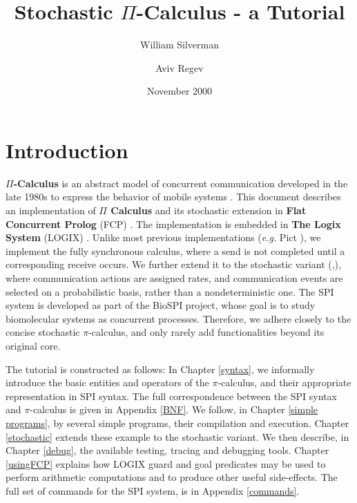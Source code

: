 \title{Stochastic $\Pi$-Calculus - a Tutorial}
\author{William Silverman \and Aviv Regev}
\date{November 2000}
 
\maketitle

\tableofcontents

\chapter{Introduction}
{\bf $\Pi$-Calculus} is an abstract model of concurrent communication
developed in the late 1980s to express the behavior of mobile systems
\cite{Milner99}.  This document describes an implementation of
{\bf $\Pi$ Calculus} and its stochastic extension in {\bf Flat
Concurrent Prolog} (FCP) \cite{Shapiro87a}.  The implementation is
embedded in {\bf The Logix System} (LOGIX)
\cite{logix:user-man,logix:user-man-supp}. Unlike most previous
implementations ({\em e.g.} Pict \cite{PT99}), we implement the fully
synchronous calculus, where a send is not completed until a
corresponding receive occurs.  We further extend it to the stochastic
variant (\cite{Pri95},\cite{RPSS}), where communication actions are
assigned rates, and communication events are selected on a
probabilistic basis, rather than a nondeterministic one.  The SPI
system is developed as part of the BioSPI project, whose goal is to
study biomolecular systems as concurrent processes. Therefore, we
adhere closely to the concise stochastic $\pi$-calculus, and only rarely
add functionalities beyond its original core.

The tutorial is constructed as follows: In Chapter \ref{syntax}, we
informally introduce the basic entities and operators of the
$\pi$-calculus, and their appropriate representation in SPI syntax. The
full correspondence between the SPI syntax and $\pi$-calculus is given in
Appendix \ref{BNF}.  We follow, in Chapter \ref{simple programs}, by
several simple programs, their compilation and execution. Chapter
\ref{stochastic} extends these example to the stochastic variant.  We
then describe, in Chapter \ref{debug}, the available testing,
tracing and debugging tools. Chapter \ref{usingFCP} explains how
LOGIX guard and goal predicates may be used to perform arithmetic
computations and to produce other useful side-effects.
The full set of commands for the SPI system, is in Appendix \ref{commands}.

